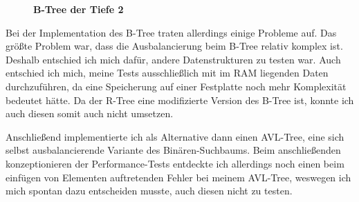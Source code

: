 \documentclass[11pt,a4paper]{article}
\begin{document}
\begin{figure}[H]
    \begin{center}
    \end{center}
    \caption{\textbf{B-Tree der Tiefe 2}}
\end{figure}

Bei der Implementation des B-Tree traten allerdings einige Probleme auf.
Das größte Problem war, dass die Ausbalancierung beim B-Tree relativ komplex ist.
Deshalb entschied ich mich dafür, andere Datenstrukturen zu testen war.
Auch entschied ich mich, meine Tests ausschließlich mit im RAM liegenden Daten
durchzuführen, da eine Speicherung auf einer Festplatte noch mehr Komplexität bedeutet
hätte. Da der R-Tree eine modifizierte Version des B-Tree ist, konnte ich auch diesen
somit auch nicht umsetzen.

\vspace*{0.5cm}

Anschließend implementierte ich als Alternative dann einen AVL-Tree, eine sich selbst
ausbalancierende Variante des Binären-Suchbaums. Beim anschließenden
konzeptionieren der Performance-Tests entdeckte ich allerdings noch einen
beim einfügen von Elementen auftretenden Fehler bei meinem AVL-Tree,
weswegen ich mich spontan dazu entscheiden musste, auch diesen nicht zu testen.
\end{document}
